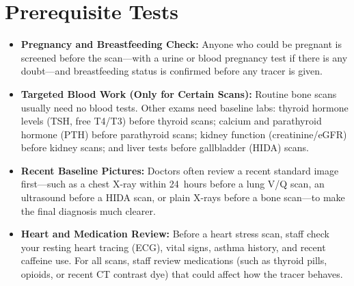 \section{Prerequisite Tests}
\begin{itemize}
\item \textbf{Pregnancy and Breastfeeding Check:} Anyone who could be pregnant is screened before the scan---with a urine or blood pregnancy test if there is any doubt---and breastfeeding status is confirmed before any tracer is given.
\item \textbf{Targeted Blood Work (Only for Certain Scans):} Routine bone scans usually need no blood tests. Other exams need baseline labs: thyroid hormone levels (TSH, free T4/T3) before thyroid scans; calcium and parathyroid hormone (PTH) before parathyroid scans; kidney function (creatinine/eGFR) before kidney scans; and liver tests before gallbladder (HIDA) scans.
\item \textbf{Recent Baseline Pictures:} Doctors often review a recent standard image first---such as a chest X-ray within 24~hours before a lung V/Q scan, an ultrasound before a HIDA scan, or plain X-rays before a bone scan---to make the final diagnosis much clearer.
\item \textbf{Heart and Medication Review:} Before a heart stress scan, staff check your resting heart tracing (ECG), vital signs, asthma history, and recent caffeine use. For all scans, staff review medications (such as thyroid pills, opioids, or recent CT contrast dye) that could affect how the tracer behaves.
\end{itemize}

